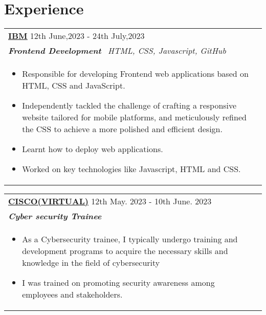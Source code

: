 \documentclass[a4paper,8pt]{article}
\begin{document}
\section{Experience}
\begin{tabularx}{\linewidth}{ @{}l r@{} }
\textbf{\uline{\href{https://deepakbari890.github.io/Portfolio/}{IBM}}} \hfill \color[HTML]{371e77} 12th June,2023  -  24th July,2023 \\[4pt]
\color[HTML]{371e77}\textbf{\textit{Frontend Development}}\ \hfill \color[HTML]{4B28A4} \textit{HTML, CSS, Javascript, GitHub} \\[5pt]
\begin{minipage}[t]{\linewidth}
    \begin{itemize}[nosep,after=\strut, leftmargin=2em, itemsep=2pt]
        \item Responsible for developing Frontend web applications based on HTML, CSS and JavaScript.
        \item Independently tackled the challenge of crafting a responsive 
  website tailored for mobile platforms, and meticulously refined the CSS to achieve a more polished and efficient design.
        \item Learnt how to deploy web applications.
        \item Worked on key technologies like Javascript, HTML and CSS.
    \end{itemize}
\end{minipage}
\end{tabularx}

\begin{tabularx}{\linewidth}{ @{}l r@{} }
\color[HTML]{1C033C} \textbf{\uline{{CISCO(VIRTUAL)}}} \hfill \color[HTML]{371e77} 12th May. 2023 - 10th June. 2023 \\[4pt]
\color[HTML]{371e77}\textbf{\textit{Cyber security Trainee}}\ \hfill \color[HTML]{4B28A4}  \\[5pt]
\begin{minipage}[t]{\linewidth}
    \begin{itemize}[nosep,after=\strut, leftmargin=2em, itemsep=2pt]
        \item As a Cybersecurity trainee, I typically undergo training and development programs to acquire the necessary skills and knowledge in the field of cybersecurity
        \item  I was trained on promoting security awareness among employees and stakeholders.
    \end{itemize}
\end{minipage}
\end{tabularx}
\end{document}
